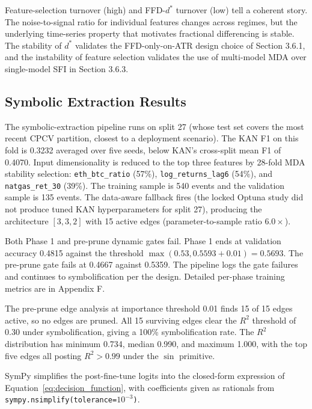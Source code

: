 \documentclass[12pt,a4paper,oneside]{article}
\begin{document}
Feature-selection turnover (high) and FFD-$d^{\ast}$ turnover (low) tell a coherent story. The noise-to-signal ratio for individual features changes across regimes, but the underlying time-series property that motivates fractional differencing is stable. The stability of $d^{\ast}$ validates the FFD-only-on-ATR design choice of Section 3.6.1, and the instability of feature selection validates the use of multi-model MDA over single-model SFI in Section 3.6.3.


\subsection{Symbolic Extraction Results}\label{subsec:results_symbolic}

The symbolic-extraction pipeline runs on split 27 (whose test set covers the most recent CPCV partition, closest to a deployment scenario). The KAN F1 on this fold is 0.3232 averaged over five seeds, below KAN's cross-split mean F1 of 0.4070. Input dimensionality is reduced to the top three features by 28-fold MDA stability selection: \texttt{eth\_btc\_ratio} (57\%), \texttt{log\_returns\_lag6} (54\%), and \texttt{natgas\_ret\_30} (39\%). The training sample is 540 events and the validation sample is 135 events. The data-aware fallback fires (the locked Optuna study did not produce tuned KAN hyperparameters for split 27), producing the architecture $[3, 3, 2]$ with 15 active edges (parameter-to-sample ratio $6.0\times$).

Both Phase 1 and pre-prune dynamic gates fail. Phase 1 ends at validation accuracy 0.4815 against the threshold $\max(0.53, 0.5593 + 0.01) = 0.5693$. The pre-prune gate fails at 0.4667 against 0.5359. The pipeline logs the gate failures and continues to symbolification per the design. Detailed per-phase training metrics are in Appendix F.

The pre-prune edge analysis at importance threshold 0.01 finds 15 of 15 edges active, so no edges are pruned. All 15 surviving edges clear the $R^2$ threshold of 0.30 under symbolification, giving a 100\% symbolification rate. The $R^2$ distribution has minimum 0.734, median 0.990, and maximum 1.000, with the top five edges all posting $R^2 > 0.99$ under the $\sin$ primitive.

SymPy simplifies the post-fine-tune logits into the closed-form expression of Equation~\ref{eq:decision_function}, with coefficients given as rationals from \texttt{sympy.nsimplify(tolerance=$10^{-3}$)}.
\end{document}
